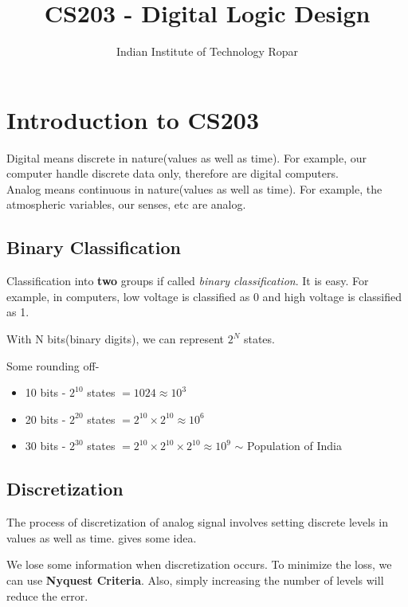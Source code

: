 \documentclass[oneside]{book}
\title{CS203 - Digital Logic Design}
\author{Indian Institute of Technology Ropar}
\begin{document}
\maketitle
{
	\hypersetup{
		hidelinks
	}
	\tableofcontents
}
\renewcommand{\arraystretch}{1.5}%

\chapter[Introduction]{Introduction to CS203}
Digital means discrete in nature(values as well as time). For example, our computer handle discrete data only, therefore are digital computers.\\
Analog means continuous in nature(values as well as time). For example, the atmospheric variables, our senses, etc are analog.

\section{Binary Classification}
Classification into \textbf{two} groups if called \textit{binary classification}. It is easy. For example, in computers, low voltage is classified as 0 and high voltage is classified as 1.\\
\begin{center}
	With N bits(binary digits), we can represent \(2^N\) states.
\end{center}
Some rounding off-
\begin{itemize}
	\item 10 bits - \(2^{10}\) states \(= 1024 \approx 10^3\)
	\item 20 bits - \(2^{20}\) states \(= 2^{10}\times 2^{10} \approx 10^6\)
	\item 30 bits - \(2^{30}\) states \(= 2^{10}\times 2^{10}\times 2^{10} \approx 10^9\) \hfill \(\sim\) Population of India
\end{itemize}

\section{Discretization}
The process of discretization of analog signal involves setting discrete levels in values as well as time.  gives some idea.

\noindent We lose some information when discretization occurs. To minimize the loss, we can use \textbf{Nyquest Criteria}. Also, simply increasing the number of levels will reduce the error.
\end{document}
